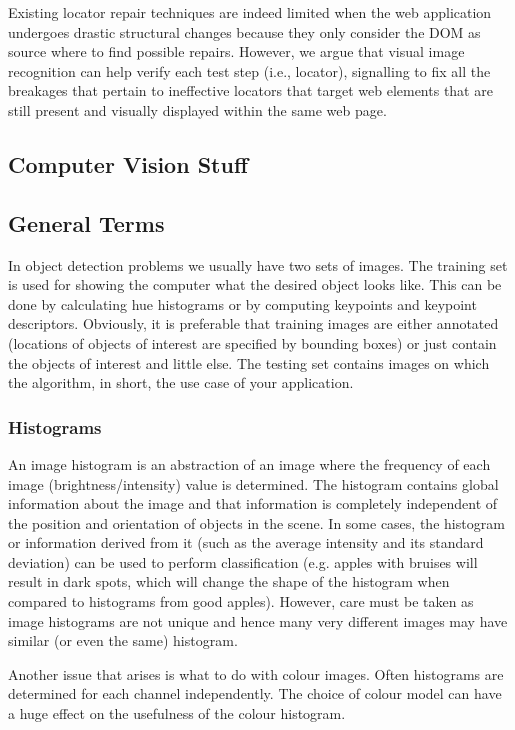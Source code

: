 Existing locator repair techniques are indeed limited when the web application undergoes drastic structural changes because they only consider the DOM as source where to find possible repairs.
However, we argue that visual image recognition can help verify each test step (i.e., locator), signalling 
to fix all the breakages that pertain to ineffective locators that target web elements that are still present and visually displayed within the same web page.

\subsection{Computer Vision Stuff}

\subsection{General Terms}

In object detection problems we usually have two sets of images. The training set is used for showing the computer what the desired object looks like. This can be done by calculating hue histograms or by computing keypoints and keypoint descriptors. Obviously, it is preferable that training images are either annotated (locations of objects of interest are specified by bounding boxes) or just contain the objects of interest and little else. The testing set contains images on which the algorithm, in short, the use case of your application.

\subsubsection{Histograms}

An image histogram is an abstraction of an image where the frequency of each image (brightness/intensity) value is determined.
The histogram contains global information about the image and that information is completely independent of the position and orientation of objects in the scene. In some cases, the histogram or information derived from it (such as the average intensity and its standard deviation) can be used to perform classification (e.g. apples with bruises will result in dark spots, which will change the shape of the histogram when compared to histograms from good apples). However, care must be taken as image histograms are not unique and hence many very different images may have similar (or even the same) histogram.

Another issue that arises is what to do with colour images. Often histograms are determined for each channel independently. 
The choice of colour model can have a huge effect on the usefulness of the colour histogram.

